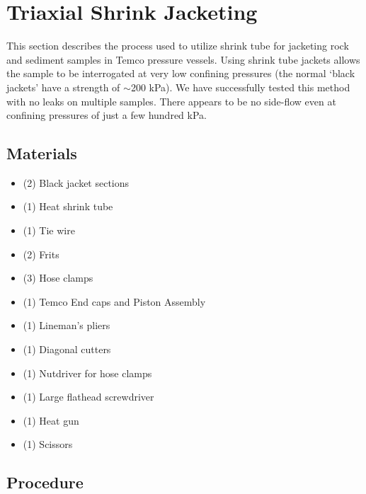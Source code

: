 \clearpage
\section{Triaxial Shrink Jacketing}
This section describes the process used to utilize shrink tube for jacketing rock and sediment samples in Temco pressure vessels.  Using shrink tube jackets allows the sample to be interrogated at very low confining pressures (the normal `black jackets' have a strength of $\sim$200 kPa).  We have successfully tested this method with no leaks on multiple samples.  There appears to be no side-flow even at confining pressures of just a few hundred kPa.  

\subsection{Materials}

\begin{itemize}

\item{(2) Black jacket sections}
\item{(1) Heat shrink tube}
\item{(1) Tie wire}
\item{(2) Frits}
\item{(3) Hose clamps}
\item{(1) Temco End caps and Piston Assembly}
\item{(1) Lineman's pliers}
\item{(1) Diagonal cutters}
\item{(1) Nutdriver for hose clamps}
\item{(1) Large flathead screwdriver}
\item{(1) Heat gun}
\item{(1) Scissors }


\end{itemize}

\subsection{Procedure}


